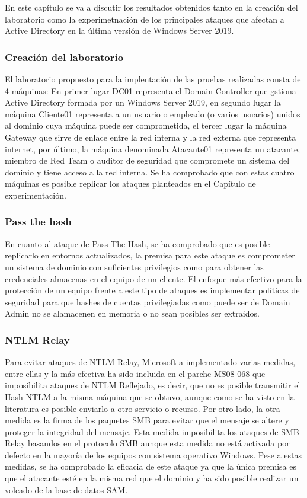 En este capítulo se va a discutir los resultados obtenidos tanto en la creación del laboratorio como la experimetnación de los principales ataques que afectan a Active Directory en la última versión de Windows Server 2019.

\subsubsection{Creación del laboratorio}
El laboratorio propuesto para la implentación de las pruebas realizadas consta de 4 máquinas: En primer lugar DC01 representa el Domain Controller que gstiona Active Directory formada por un Windows Server 2019, en segundo lugar la máquina Cliente01 representa a un usuario o empleado (o varios usuarios) unidos al dominio cuya máquina puede ser comprometida, el tercer lugar la máquina Gateway que sirve de enlace entre la red interna y la red externa que representa internet, por último, la máquina denominada Atacante01 representa un atacante, miembro de Red Team o auditor de seguridad que compromete un sistema del dominio y tiene acceso a la red interna. Se ha comprobado que con estas cuatro máquinas es posible replicar los ataques planteados en el Capítulo de experimentación. 
\subsubsection{Pass the hash}
En cuanto al ataque de Pass The Hash, se ha comprobado que es posible replicarlo en entornos actualizados, la premisa para este ataque es comprometer un sistema de dominio con suficientes privilegios como para obtener las credenciales almacenas en el equipo de un cliente. El enfoque más efectivo para la protección de un equipo frente a este tipo de ataques es implementar políticas de seguridad para que hashes de cuentas privilegiadas como puede ser de Domain Admin no se alamacenen en memoria o no sean posibles ser extraidos.
\subsubsection{NTLM Relay}
Para evitar ataques de NTLM Relay, Microsoft a implementado varias medidas, entre ellas y la más efectiva ha sido incluida en el parche MS08-068 que imposibilita ataques de NTLM Reflejado, es decir, que no es posible transmitir el Hash NTLM a la misma máquina que se obtuvo, aunque como se ha visto en la literatura es posible enviarlo a otro servicio o recurso. Por otro lado, la otra medida es la firma de los paquetes SMB para evitar que el mensaje se altere y proteger la integridad del mensaje. Esta medida imposibilita los ataques de SMB Relay basandos en el protocolo SMB aunque esta medida no está activada por defecto en la mayoría de los equipos con sistema operativo Windows. Pese a estas medidas, se ha comprobado la eficacia de este ataque ya que la única premisa es que el atacante esté en la misma red que el dominio y ha sido posible realizar un volcado de la base de datos SAM. 
